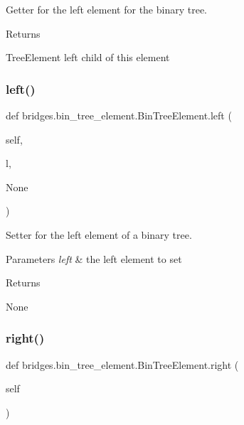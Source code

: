 Getter for the left element for the binary tree. 

\begin{DoxyReturn}{Returns}


Tree\+Element left child of this element 
\end{DoxyReturn}
\mbox{\label{classbridges_1_1bin__tree__element_1_1_bin_tree_element_a8c3fb48d81700421f87a439b030d34fa}} 
\subsubsection{\texorpdfstring{left()}{left()}\hspace{0.1cm}{\footnotesize\ttfamily [2/2]}}
{\footnotesize\ttfamily def bridges.\+bin\+\_\+tree\+\_\+element.\+Bin\+Tree\+Element.\+left (\begin{DoxyParamCaption}\item[{}]{self,  }\item[{}]{l,  }\item[{}]{None }\end{DoxyParamCaption})}



Setter for the left element of a binary tree. 


\begin{DoxyParams}{Parameters}
{\em left} & the left element to set \\
\hline
\end{DoxyParams}
\begin{DoxyReturn}{Returns}


None 
\end{DoxyReturn}
\mbox{\label{classbridges_1_1bin__tree__element_1_1_bin_tree_element_adb7eaa3c67233aa5c368e8907043f451}} 
\subsubsection{\texorpdfstring{right()}{right()}\hspace{0.1cm}{\footnotesize\ttfamily [1/2]}}
{\footnotesize\ttfamily def bridges.\+bin\+\_\+tree\+\_\+element.\+Bin\+Tree\+Element.\+right (\begin{DoxyParamCaption}\item[{}]{self }\end{DoxyParamCaption})}



